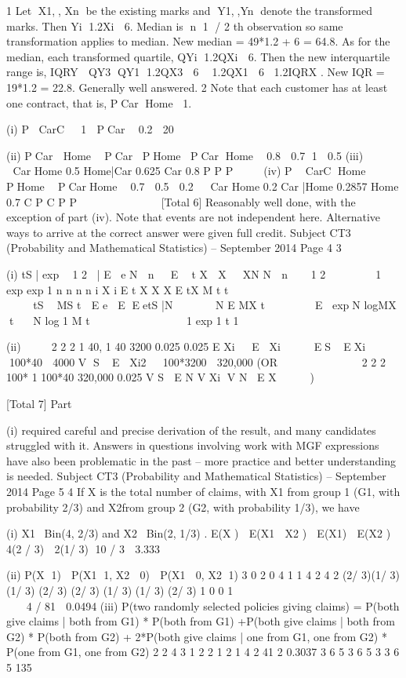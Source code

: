 1 Let X1,, Xn be the existing marks and Y1,,Yn denote the transformed marks.
Then Yi 1.2Xi  6.
Median is n 1 / 2 th observation so same transformation applies to median.
New median = 49*1.2 + 6 = 64.8.
As for the median, each transformed quartile, QYi 1.2QXi  6. Then the new
interquartile range is, IQRY  QY3 QY1 1.2QX3  6  1.2QX1  6 1.2IQRX .
New IQR = 19*1.2 = 22.8. 
Generally well answered.
2 Note that each customer has at least one contract, that is, PCar Home 1.
\item (i) P CarC  1  PCar  0.2  20%
\item (ii) PCar  Home  PCar PHome PCar Home 
 0.8  0.7 1  0.5
(iii)    
 
Car Home 0.5 Home|Car 0.625
Car 0.8
P
P
P
    
(iv) P  CarC Home  PHome  PCarHome  0.7  0.5  0.2
 
Car Home 0.2 Car |Home 0.2857
Home 0.7
C
P C
P
P
            
[Total 6]
Reasonably well done, with the exception of part (iv). Note that events are not independent
here. Alternative ways to arrive at the correct answer were given full credit.
Subject CT3 (Probability and Mathematical Statistics) – September 2014 
Page 4
3 \item (i) tS | exp  1 2 |
  E e N  n  E  t X  X  XN N  n
  1 2      
1
exp exp 1
n n n
n i X
i
E t X X X E tX M t t


                      
   tS 
MS t  E e
 E EetS |N
 
  N
E MX t   
 
 E expN logMX t 
N log 1
M t
           
1
exp 1 t 1               

\item (ii)  
 
2 2
2
1 40, 1 40 3200
0.025 0.025
E Xi   E Xi    
ES EXi  100*40  4000
V S E Xi2  100*3200  320,000
(OR
           
   
  2 2
  2
  100* 1 100*40 320,000
  0.025
  V S  E N V Xi V N E X     )

[Total 7]
Part \item (i) required careful and precise derivation of the result, and many candidates struggled
with it. Answers in questions involving work with MGF expressions have also been
problematic in the past – more practice and better understanding is needed.
Subject CT3 (Probability and Mathematical Statistics) – September 2014 
Page 5
4 If X is the total number of claims, with X1 from group 1 (G1, with probability 2/3) and
X2from group 2 (G2, with probability 1/3), we have
\item (i) X1~ Bin(4, 2/3) and X2~ Bin(2, 1/3) .
E(X )  E(X1  X2 )  E(X1)  E(X2 )
 4(2 / 3)  2(1/ 3) 10 / 3  3.333 
\item (ii) P(X 1)  P(X1 1, X2  0)  P(X1  0, X2 1)
3 0 2 0 4 1 1 4 2 4 2
(2/ 3)(1/ 3) (1/ 3) (2/ 3) (2/ 3) (1/ 3) (1/ 3) (2/ 3)
1 0 0 1
       
         
       
 4 / 81  0.0494 
(iii) P(two randomly selected policies giving claims) =
  P(both give claims | both from G1) * P(both from G1)
+P(both give claims | both from G2) * P(both from G2)
+ 2*P(both give claims | one from G1, one from G2) * P(one from G1, one
                                                       from G2)
2 2 4 3 1 2 2 1 2 1 4 2 41 2 0.3037
3 6 5 3 6 5 3 3 6 5 135
                   
      

